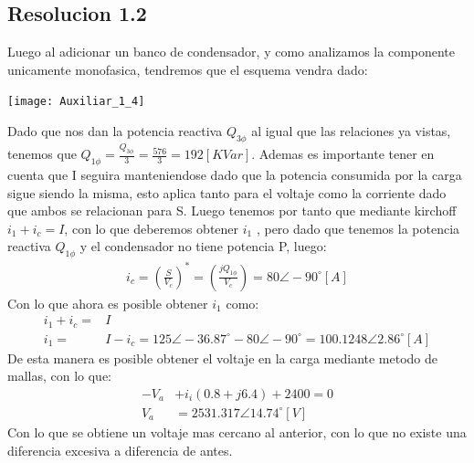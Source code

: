 \documentclass[
  11pt,
  letterpaper,
   addpoints,
  ]{exam}
\begin{document}
\begin{questions}
\begin{solution}
\subsection*{Resolucion 1.2}
Luego al adicionar un banco de condensador, y como analizamos la componente unicamente monofasica, tendremos que el esquema vendra dado:
\begin{center}
    \texttt{[image: Auxiliar\_1\_4]}
  \end{center}
Dado que nos dan la potencia reactiva $Q_{3\phi}$ al igual que las relaciones ya vistas, tenemos que $Q_{1\phi} = \frac{Q_{3\phi}}{3} =\frac{576}{3}= 192[KVar]$. Ademas es importante tener en cuenta que I seguira manteniendose dado que la potencia consumida por la carga sigue siendo la misma, esto aplica tanto para el voltaje como la corriente dado que ambos se relacionan para S. Luego tenemos por tanto que mediante kirchoff $i_{1}+i_{c} = I$, con lo que deberemos obtener $i_{1}$ , pero dado que tenemos la potencia reactiva $Q_{1\phi}$ y el condensador no tiene potencia P, luego:
\begin{align}
    i_{c} = \left(\frac{S}{V_{c}}\right)^{*} = \left( \frac{jQ_{1\phi}}{V_{c}}\right) = 80 \angle -90^{\circ} [A] 
\end{align}
Con lo que ahora es posible obtener $i_{1}$ como:
\begin{align}
    i_{1} + i_{c} =& I\\
    i_{1} =&  I- i_{c} = 125 \angle -36.87^{\circ} - 80\angle -90^{\circ} = 100.1248 \angle 2.86^{\circ} [A] 
\end{align}
De esta manera es posible obtener el voltaje en la carga mediante metodo de mallas, con lo que:
\begin{align}
    -V_{a} &+ i_{i}(0.8 + j6.4)+ 2400 = 0\\
    V_{a} &= 2531.317 \angle 14.74^{\circ} [V]
\end{align}
Con lo que se obtiene un voltaje mas cercano al anterior, con lo que no existe una diferencia excesiva a diferencia de antes.

\end{solution}
\end{questions}
\end{document}
